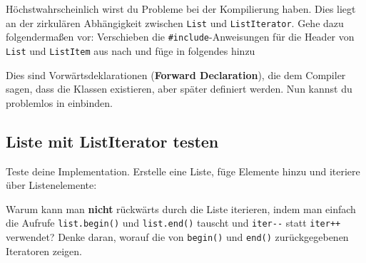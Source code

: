 

Höchstwahrscheinlich wirst du Probleme bei der Kompilierung haben.
Dies liegt an der zirkulären Abhängigkeit zwischen \lstinline{List} und \lstinline{ListIterator}.
Gehe dazu folgendermaßen vor:
Verschieben die \lstinline{#include}-Anweisungen für die Header von \lstinline{List} und \lstinline{ListItem} aus  nach  und füge in  folgendes hinzu



Dies sind Vorwärtsdeklarationen (\textbf{Forward Declaration}), die dem Compiler sagen, dass die Klassen existieren, aber später definiert werden. Nun kannst du problemlos  in  einbinden.

\subsection{Liste mit ListIterator testen}
Teste deine Implementation.
Erstelle eine Liste, füge Elemente hinzu und iteriere über Listenelemente:



Warum kann man \textbf{nicht} rückwärts durch die Liste iterieren, indem man einfach die Aufrufe \lstinline{list.begin()} und \lstinline{list.end()} tauscht und \lstinline{iter--} statt \lstinline{iter++} verwendet?
Denke daran, worauf die von \lstinline{begin()} und \lstinline{end()} zurückgegebenen Iteratoren zeigen.


